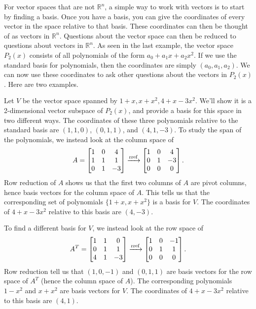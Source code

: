 For vector spaces that are not ${\mathbb{R}}^n$, a simple way to work with vectors is to start by finding a basis. Once you have a basis, you can give the coordinates of every vector in the space relative to that basis.  These coordinates can then be thought of as vectors in ${\mathbb{R}}^n$. Questions about the vector space can then be reduced to questions about vectors in $\mathbb{R}^n$.  As seen in the last example, the vector space $P_2(x)$ consists of all polynomials of the form $a_0+a_1x+a_2x^2$. If we use the standard basis for polynomials, then the coordinates are simply $(a_0,a_1,a_2)$. We can now use these coordinates to ask other questions about the vectors in $P_2(x)$. Here are two examples.

\begin{example}
Let $V$ be the vector space spanned by $1+x,x+x^2, 4+x-3x^2$. We'll show it is a 2-dimensional vector subspace of $P_2(x)$, and provide a basis for this space in two different ways. The coordinates of these three polynomials relative to the standard basis are $(1,1,0)$, $(0,1,1)$, and $(4,1,-3)$. 
To study the span of the polynomials, we instead look at the column space of 
$$
A=
\begin{bmatrix}
 1 & 0 & 4\\
 1 & 1 & 1\\
 0 & 1 & -3
\end{bmatrix} 
\xrightarrow{\operatorname{rref}}
\begin{bmatrix}
 1 & 0 & 4\\
 0 & 1 & -3\\
 0 & 0 & 0
\end{bmatrix} 
.$$
Row reduction of $A$ shows us that the first two columns of $A$ are pivot columns, 
hence basis vectors for the column space of $A$. 
This tells us that the corresponding set of polynomials $\{1+x, x+x^2\}$ is a basis for $V$. 
The coordinates of $4+x-3x^2$ relative to this basis are $(4,-3)$.

To find a different basis for $V$, we instead look at the row space of
$$A^T
=
\begin{bmatrix}
 1 & 1 & 0 \\
 0 & 1 & 1 \\
 4 & 1 & -3
\end{bmatrix}
\xrightarrow{\operatorname{rref}}
\begin{bmatrix}
 1 & 0 & -1 \\
 0 & 1 & 1 \\
 0 & 0 & 0
\end{bmatrix}
.$$ 
Row reduction tell us that $(1,0,-1)$ and $(0,1,1)$ are basis vectors for the row space of $A^T$ (hence the column space of $A$).  The corresponding polynomials $1-x^2$ and $x+x^2$ are basis vectors for $V$. The coordinates of $4+x-3x^2$ relative to this basis are $(4,1)$.
  
\end{example}

